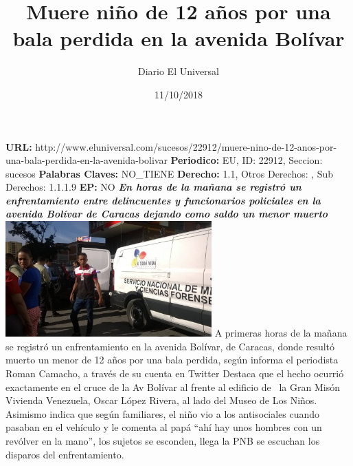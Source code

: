 \documentclass{article}%
\title{\textbf{Muere niño de 12 años por una bala perdida en la avenida Bolívar}}%
\author{Diario El Universal}%
\date{11/10/2018}%
\begin{document}
%
\normalsize%
\maketitle%
\textbf{URL: }%
http://www.eluniversal.com/sucesos/22912/muere{-}nino{-}de{-}12{-}anos{-}por{-}una{-}bala{-}perdida{-}en{-}la{-}avenida{-}bolivar\newline%
%
\textbf{Periodico: }%
EU, %
ID: %
22912, %
Seccion: %
sucesos\newline%
%
\textbf{Palabras Claves: }%
NO\_TIENE\newline%
%
\textbf{Derecho: }%
1.1, %
Otros Derechos: %
, %
Sub Derechos: %
1.1.1.9\newline%
%
\textbf{EP: }%
NO\newline%
\newline%
%
\textbf{\textit{En horas de la mañana se registró un enfrentamiento entre delincuentes y funcionarios policiales en la avenida Bolívar de Caracas dejando como saldo un menor muerto}}%
\newline%
\newline%
%
\includegraphics[width=300px]{162.jpg}%
\newline%
%
A primeras horas de la mañana se registró un enfrentamiento en la avenida Bolívar, de Caracas, donde resultó muerto un menor de 12 años por una bala perdida, según informa el periodista Roman Camacho, a través de su cuenta en Twitter%
\newline%
%
Destaca que el hecho ocurrió exactamente en el cruce de la Av Bolívar al frente al edificio de~ la Gran Misón Vivienda Venezuela, Oscar López Rivera, al lado del Museo de Los Niños.%
\newline%
%
Asimismo indica que según familiares, el niño vio a los antisociales cuando pasaban en el vehículo y le comenta al papá “ahí hay unos hombres con un revólver en la mano”, los sujetos se esconden, llega la PNB se escuchan los disparos del enfrentamiento.%
\newline%
%
\end{document}
